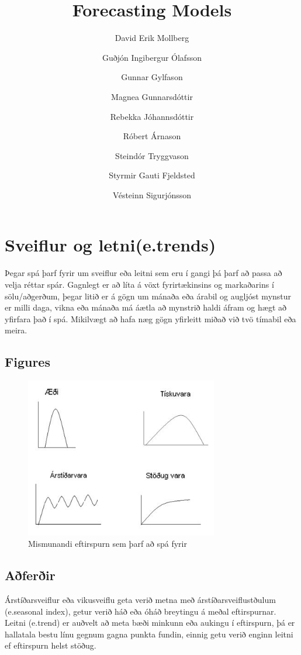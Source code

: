 \documentclass[10pt]{article}
\title{Forecasting Models}
\author{David Erik Mollberg \and Guðjón Ingibergur Ólafsson \and Gunnar Gylfason \and Magnea Gunnarsdóttir \and Rebekka Jóhannsdóttir \and Róbert Árnason \and Steindór Tryggvason \and Styrmir Gauti Fjeldsted \and Vésteinn Sigurjónsson}
\begin{document}
\maketitle

\section {Sveiflur og letni(e.trends)}
 
Þegar spá þarf fyrir um sveiflur eða leitni sem eru í gangi þá þarf að passa að velja réttar spár. Gagnlegt er að líta á vöxt fyrirtækinsins og markaðarins í sölu/aðgerðum, þegar litið er á gögn um mánaða eða árabil og augljóst mynstur er milli daga, vikna eða mánaða má áætla að mynstrið haldi áfram og hægt að yfirfara það í spá. Mikilvægt að hafa næg gögn yfirleitt miðað við tvö tímabil eða meira.

\subsection{Figures}


\begin{figure}[htb]
\begin{center}

\includegraphics[width=0.75\textwidth]{tegundirspar}
\caption{Mismunandi eftirspurn sem þarf að spá fyrir}
\label{fig:figure1}
\end{center}
\end{figure}

\subsection{Aðferðir}
Árstíðarsveiflur eða vikusveiflu geta verið metna með árstíðarsveiflustðulum (e.seasonal index), getur verið háð eða óháð breytingu á meðal eftirspurnar. Leitni (e.trend) er auðvelt að meta bæði minkunn eða aukingu í eftirspurn, þá er hallatala bestu línu gegnum gagna punkta fundin, einnig getu verið enginn leitni ef eftirspurn helst stöðug.
\end{document}
